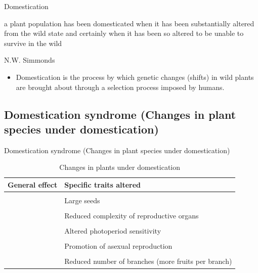 \documentclass[
  ignorenonframetext,
  aspectratio=169]{beamer}
\providecommand{\tightlist}{%
  \setlength{\itemsep}{0pt}\setlength{\parskip}{0pt}}
\begin{document}
\begin{frame}{Domestication}
\protect\hypertarget{domestication}{}
\begin{block}{}
a plant population has been domesticated when it has been substantially altered from the wild state and certainly when it has been so altered to be unable to survive in the wild
\end{block}

N.W. Simmonds

\begin{itemize}
\tightlist
\item
  Domestication is the process by which genetic changes (shifts) in wild
  plants are brought about through a selection process imposed by
  humans.
\end{itemize}
\end{frame}

\hypertarget{domestication-syndrome-changes-in-plant-species-under-domestication}{%
\subsection{Domestication syndrome (Changes in plant species under
domestication)}\label{domestication-syndrome-changes-in-plant-species-under-domestication}}

\begin{frame}{Domestication syndrome (Changes in plant species under
domestication)}
\begin{table}

\caption{\label{tab:domestication-syndrome}Changes in plants under domestication}
\centering
\fontsize{6}{8}\selectfont
\begin{tabular}[t]{>{\raggedright\arraybackslash}p{16em}>{\raggedright\arraybackslash}p{40em}}
\toprule
General effect & Specific traits altered\\
\midrule
\textbf{\cellcolor{gray!6}{Increased seedling vigor (more plants germinating)}} & \cellcolor{gray!6}{Loss of seed or tuber dormancy}\\
\textbf{} & Large seeds\\
\textbf{\cellcolor{gray!6}{Modified reproductive system}} & \cellcolor{gray!6}{Increased selfing}\\
\textbf{} & Reduced complexity of reproductive organs\\
\textbf{\cellcolor{gray!6}{}} & \cellcolor{gray!6}{Vegetatively reproducing plants}\\
\addlinespace
\textbf{} & Altered photoperiod sensitivity\\
\textbf{\cellcolor{gray!6}{}} & \cellcolor{gray!6}{Shift in sex form of species}\\
\textbf{} & Promotion of asexual reproduction\\
\textbf{\cellcolor{gray!6}{Increased number of seeds harvested}} & \cellcolor{gray!6}{Non-shattering}\\
\textbf{} & Reduced number of branches (more fruits per branch)\\
\bottomrule
\end{tabular}
\end{table}
\end{frame}
\end{document}
